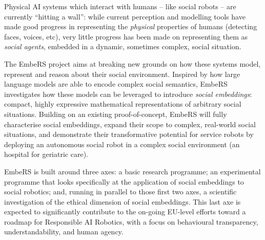 \documentclass[11pt,a4paper]{report}
\newcommand{\project}{EmbeRS\xspace}
\begin{document}
Physical AI systems which interact with humans -- like social robots -- are
currently ``hitting a wall'': while current perception and modelling tools have
made good progress in representing the \emph{physical} properties of humans (detecting
faces, voices, etc), very little progress has been made on representing them as
\emph{social agents}, embedded in a dynamic, sometimes complex, social situation.



The \project project aims at breaking new grounds on how these systems
model, represent and reason about their social environment. Inspired by how
large language models are able to encode complex social semantics, \project
investigates how these models can be leveraged to introduce \emph{social
embeddings}: compact, highly expressive mathematical representations of
arbitrary social situations.  Building on an existing proof-of-concept, \project
will fully characterise social embeddings, expand their scope to complex,
real-world social situations, and demonstrate their transformative potential
for service robots by deploying an autonomous social robot in a complex social
environment (an hospital for geriatric care).

\project is built around three axes: a basic research programme; an experimental
programme that looks specifically at the application of social embeddings to
social robotics; and, running in parallel to those first two axes, a scientific
investigation of the ethical dimension of social embeddings. This last axe is
expected to significantly contribute to the on-going EU-level efforts toward a
roadmap for Responsible AI Robotics, with a focus on behavioural transparency,
understandability, and human agency.

%
%
%
\end{document}
